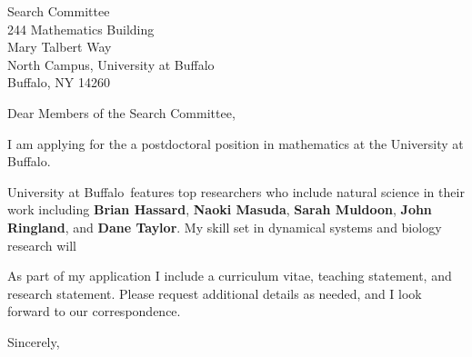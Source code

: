 \documentclass[11pt,a4paper]{letter}
\begin{document}

\def\School{University at Buffalo}

\begin{letter}
{Search Committee\\
244 Mathematics Building\\
Mary Talbert Way\\
North Campus, University at Buffalo\\
Buffalo, NY 14260
}


\opening{Dear Members of the Search Committee,}

I am applying for the a postdoctoral position in mathematics at the \School. 



\School~features top researchers who include natural science in their work including \textbf{Brian Hassard}, \textbf{Naoki Masuda}, \textbf{Sarah Muldoon}, \textbf{John Ringland}, and \textbf{Dane Taylor}. My skill set in dynamical systems and biology research will  



As part of my application I include a curriculum vitae, teaching statement, and research statement. Please request additional details as needed, and I look forward to our correspondence.

\closing{Sincerely,}
\end{letter}
\end{document}
